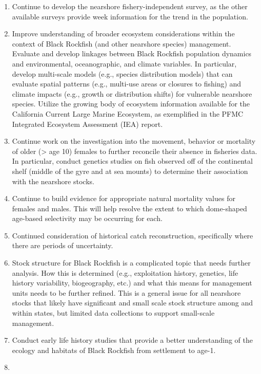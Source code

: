 \documentclass[11pt,
  letterpaper,
]{article}
\providecommand{\tightlist}{%
  \setlength{\itemsep}{0pt}\setlength{\parskip}{0pt}}
\providecommand{\tightlist}{%
  \setlength{\itemsep}{0pt}\setlength{\parskip}{0pt}}
\begin{document}
\begin{enumerate}
\def\labelenumi{\arabic{enumi}.}
\tightlist
\item
  Continue to develop the nearshore fishery-independent survey, as the other available surveys provide week information for the trend in the population.
\item
  Improve understanding of broader ecosystem considerations within the context of Black Rockfish (and other nearshore species) management. Evaluate and develop linkages between Black Rockfish population dynamics and environmental, oceanographic, and climate variables. In particular, develop multi-scale models (e.g., species distribution models) that can evaluate spatial patterns (e.g., multi-use areas or closures to fishing) and climate impacts (e.g., growth or distribution shifts) for vulnerable nearshore species. Utilize the growing body of ecosystem information available for the California Current Large Marine Ecosystem, as exemplified in the PFMC Integrated Ecosystem Assessment (IEA) report.
\item
  Continue work on the investigation into the movement, behavior or mortality of older (\textgreater{} age 10) females to further reconcile their absence in fisheries data. In particular, conduct genetics studies on fish observed off of the continental shelf (middle of the gyre and at sea mounts) to determine their association with the nearshore stocks.
\item
  Continue to build evidence for appropriate natural mortality values for females and males. This will help resolve the extent to which dome-shaped age-based selectivity may be occurring for each.
\item
  Continued consideration of historical catch reconstruction, specifically where there are periods of uncertainty.
\item
  Stock structure for Black Rockfish is a complicated topic that needs further analysis. How this is determined (e.g., exploitation history, genetics, life history variability, biogeography, etc.) and what this means for management units needs to be further refined. This is a general issue for all nearshore stocks that likely have significant and small scale stock structure among and within states, but limited data collections to support small-scale management.
\item
  Conduct early life history studies that provide a better understanding of the ecology and habitats of Black Rockfish from settlement to age-1.
\item

\end{enumerate}
\end{document}
